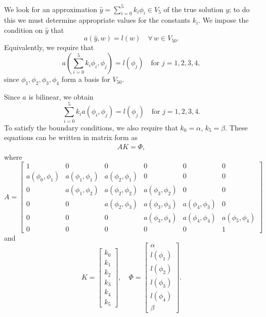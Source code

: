 We look for an approximation $\hat{y} = \sum_{i=0}^5 k_i \phi_i \in V_5$ of the true solution $y$; to do this we must determine appropriate values for the constants $k_i$.
We impose the condition on $\hat{y}$ that 
\[a(\hat{y},w) = l(w) \quad \forall \, w \in V_{50}.\]
Equivalently, we require that 
\[a \left( \sum_{i=0}^5 k_i \phi_i,\phi_j \right) = l(\phi_j) \quad \text{for } j = 1,2,3,4,\]
since $\phi_1, \phi_2, \phi_3, \phi_4$ form a basis for $V_{50}$.

Since $a$ is bilinear, we obtain 
\[\sum_{i=0}^5 k_i  a ( \phi_i,\phi_j ) = l(\phi_j) \quad \text{for } j = 1,2,3,4.\]
To satisfy the boundary conditions, we also require that $k_0 = \alpha$, $k_5 = \beta$.
These equations can be written in matrix form as
\begin{align} AK = \Phi,\label{eqn:FEM_linear_system}\end{align}
where
\[A = \left[\begin{array}{cccccc}1 & 0 & 0 & 0 & 0 & 0 \\a(\phi_0,\phi_1) & a(\phi_1,\phi_1) & a(\phi_2,\phi_1) & 0 & 0 & 0 \\0 & a(\phi_1,\phi_2) & a(\phi_2,\phi_2) & a(\phi_3,\phi_2) & 0 & 0 \\0 & 0 & a(\phi_2,\phi_3) & a(\phi_3,\phi_3) & a(\phi_4,\phi_3) & 0 \\0 & 0 & 0 & a(\phi_3,\phi_4) & a(\phi_4,\phi_4) & a(\phi_5,\phi_4) \\0 & 0 & 0 & 0 & 0 &1\end{array}\right]\]
and
\[K = \left[\begin{array}{c}k_0 \\k_1 \\k_2 \\k_3 \\k_4 \\k_5\end{array}\right] , \quad\Phi =  \left[\begin{array}{c}\alpha \\l(\phi_1) \\l(\phi_2) \\l(\phi_3) \\l(\phi_4) \\\beta\end{array}\right].\]

